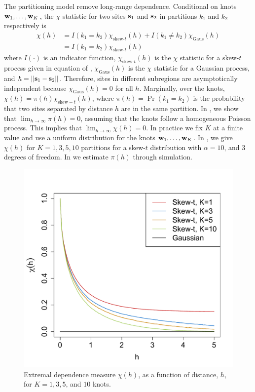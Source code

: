 \documentclass[useAMS,usenatbib,referee]{biom}
\begin{document}
The partitioning model remove long-range dependence. Conditional on knots $\mbox{\bf w}_1, \ldots, \mbox{\bf w}_K$, the $\chi$ statistic for two sites $\mbox{\bf s}_1$ and $\mbox{\bf s}_2$ in partitions $k_1$ and $k_2$ respectively is
\begin{align}
  \chi(h) &= I(k_1 = k_2) \chi_{\text{skew-}t}(h) + I(k_1 \neq k_2) \chi_{\text{Gaus}}(h) \nonumber \\
         &= I(k_1 = k_2) \chi_{\text{skew-}t}(h) \label{steq:chiskewt}
\end{align}
where $I(\cdot)$ is an indicator function, $\chi_{\text{skew-}t}(h)$ is the $\chi$ statistic for a skew-$t$ process given in equation  of , $\chi_{\text{Gaus}}(h)$ is the $\chi$ statistic for a Gaussian process, and $h = ||\mbox{\bf s}_1 - \mbox{\bf s}_2||$.
Therefore, sites in different subregions are asymptotically independent because $\chi_{\text{Gaus}}(h) = 0$ for all $h$.
Marginally, over the knots, $\chi(h) = \pi(h) \chi_{\text{skew}-t}(h)$, where $\pi(h) = \Pr(k_1 = k_2)$ is the probability that two sites separated by distance $h$ are in the same partition.
In , we show that $\lim_{h \rightarrow \infty} \pi(h) = 0$, assuming that the knots follow a homogeneous Poisson process.
This implies that $\lim_{h \rightarrow \infty} \chi(h) = 0$.
In practice we fix $K$ at a finite value and use a uniform distribution for the knots $\mbox{\bf w}_1, \ldots, \mbox{\bf w}_K$.
In , we give $\chi(h)$ for $K = 1, 3, 5, 10$ partitions for a skew-$t$ distribution with $\alpha = 10$, and 3 degrees of freedom.
In  we estimate $\pi(h)$ through simulation.

\begin{figure}
  \centering
  \includegraphics[width=0.5\linewidth]{plots/chi-h.pdf}
  \caption{Extremal dependence measure $\chi(h)$, as a function of distance, $h$, for $K = 1, 3, 5$, and $10$ knots.}
  \label{stfig:chi}
\end{figure}
\end{document}
